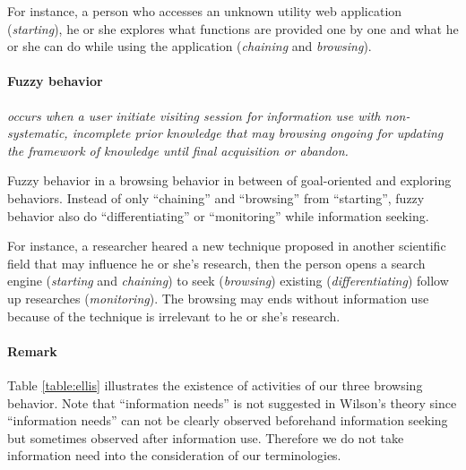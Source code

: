 For instance, a person who accesses an unknown utility web application (\emph{starting}), 
he or she explores what functions are provided one by one and 
what he or she can do while using the application (\emph{chaining} and \emph{browsing}).

\paragraph{Fuzzy behavior} \emph{occurs when a user initiate visiting session for information use
 with non-systematic, incomplete prior knowledge that may browsing ongoing for updating 
the framework of knowledge until final acquisition or abandon.}

Fuzzy behavior in a browsing behavior in between of goal-oriented and exploring behaviors.
Instead of only ``chaining'' and ``browsing'' from ``starting'', fuzzy behavior also do
``differentiating'' or ``monitoring'' while information seeking.

For instance, a researcher heared a new technique proposed in another scientific field 
that may influence he or she's research, then the person 
opens a search engine (\emph{starting} and \emph{chaining}) to seek (\emph{browsing}) 
existing (\emph{differentiating}) follow up researches (\emph{monitoring}). 
The browsing may ends without information use because of the technique is irrelevant 
to he or she's research.

\paragraph{Remark} Table \ref{table:ellis} illustrates the existence of activities of our three
browsing behavior. Note that ``information needs'' is not suggested in Wilson's theory \cite{wilson1981user} 
since ``information needs'' can not be clearly observed beforehand information seeking but sometimes
observed after information use. Therefore we do not take information need into the 
consideration of our terminologies.


